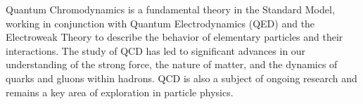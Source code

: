 Quantum Chromodynamics is a fundamental theory in the Standard Model, working in conjunction with Quantum Electrodynamics (QED) and the Electroweak Theory to describe the behavior of elementary particles and their interactions. The study of QCD has led to significant advances in our understanding of the strong force, the nature of matter, and the dynamics of quarks and gluons within hadrons. QCD is also a subject of ongoing research and remains a key area of exploration in particle physics.